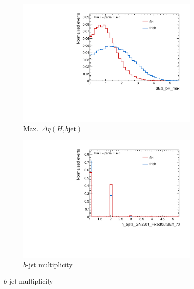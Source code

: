 \begin{figure}[htbp]
  \centering
  \begin{subfigure}[b]{0.45\textwidth}
    \centering
    \includegraphics[width=\textwidth]{images/plots_tH_tHqb_for_thesis/dEta_bH_max_signals_ATLAS.pdf}
    \caption{Max.\ $\Delta \eta (H,b\text{jet})$}
    \label{fig:dEta_bH_max}
  \end{subfigure}
  \hfill
  \begin{subfigure}[b]{0.45\textwidth}
    \centering
    \includegraphics[width=\textwidth]{images/plots_tH_tHqb_for_thesis/n_bjets_GN2v01_FixedCutBEff_70_signals_ATLAS.pdf}
    \caption{$b$-jet multiplicity}
    \label{fig:n_bjets}
  \end{subfigure}


\end{figure}
